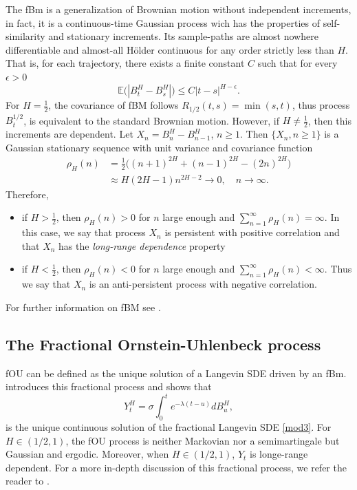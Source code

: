 \documentclass[smallextended]{svjour3}
\newcommand{\E}{\mathbb{E}}
\begin{document}
        The fBm is a generalization of Brownian motion without independent 
    increments, in fact,  it is a continuous-time Gaussian process wich
    has the properties of self-similarity and stationary increments. Its 
    sample-paths are almost nowhere differentiable and
    almost-all H\"{o}lder continuous for any order strictly less than $H$. That 
    is, for each trajectory, there exists a finite constant $C$ such that for 
    every$\epsilon > 0$
    \[
        \E \big(
            | B_t ^ H - B_s ^ H|
        \big)
        \le
        C |t - s| ^ {H - \epsilon} .
    \]
%
    For $H = \tfrac{1}{2} $, the covariance of fBM follows
    $
        R_{1 / 2} (t, s)
            = \min(s, t)
    $, thus process $B_t ^ {1 / 2}$, is equivalent to
    the standard Brownian motion. However, if $H \ne \tfrac{1}{2}$, 
    then this increments are dependent.
%
        Let  $X_n = B_n ^ H - B_{n - 1} ^ H$, $n \ge 1$.
    Then $\{X_n, n \ge 1\}$ is a Gaussian stationary sequence with unit
    variance and covariance function 
    \begin{align*}
        \rho_H (n) &=
            \frac{1}{2}
            \Big(
                (n + 1) ^ {2 H} + (n - 1) ^ {2 H}
                - (2 n) ^{2 H}
            \Big)
            \\
            &\approx
            H (2H - 1)n^{2H-2} \to 0, \quad n \to \infty.
    \end{align*}
    Therefore,
    \begin{itemize}
        \item
            if $H > \tfrac{1}{2}$, then $\rho_H(n) > 0$ for $n$ large enough and
            $\sum_{n=1}^\infty \rho_H(n)=\infty$. In this case, we say that
            process $X_n$ is persistent with positive correlation and that
            $X_n$ has the \emph{long-range dependence} property
        \item
            if $H < \tfrac{1}{2}$, then $\rho_H(n) < 0$ for $n$ large enough and
            $\sum_{n=1}^\infty \rho_H(n)<\infty$. Thus we say that $X_n$ is an 
            anti-persistent process with negative correlation.
    \end{itemize}
    For further information on fBM see \cite{ra,nu,mi}.
    
    \subsection{The Fractional Ornstein-Uhlenbeck process}\label{sect-OU}
        fOU can be defined as the unique solution of a Langevin SDE driven by
    an fBm.\citeauthor{ch-ka-ma} introduces this fractional process and shows 
    that 
     \begin{equation}
        Y_t ^ H = 
            \sigma \int_0 ^ t e ^ {-\lambda(t - u)} dB_u^H, 
        \label{mod4}
    \end{equation}
    is the unique continuous solution of the fractional Langevin SDE 
    \eqref{mod3}.
    For $H \in (1/2,1)$, the fOU process is neither Markovian 
    nor a semimartingale but 
    Gaussian and ergodic. Moreover, when $H \in(1/2,1)$, $Y_t$ is longe-range 
    dependent. For a more in-depth discussion of this fractional process, we 
    refer the reader to \citet{ch-ka-ma,ra, du-no}.
\end{document}
